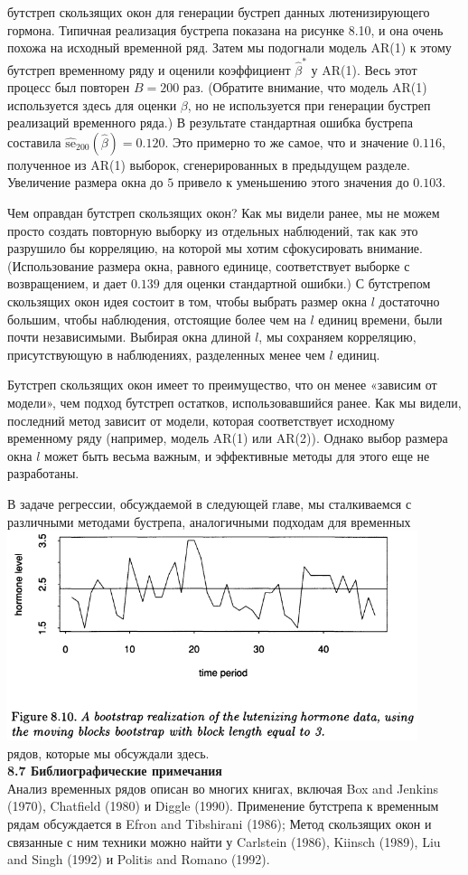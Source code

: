 \documentclass{report}
\begin{document}
бутстреп скользящих окон для генерации бустреп данных лютенизирующего гормона. Типичная реализация бустрепа показана на рисунке 8.10, и она очень похожа на исходный временной ряд. Затем мы подогнали модель AR(1) к этому бутстреп временному ряду и оценили коэффициент $\hat \beta^*$ у AR(1). Весь этот процесс был повторен $B=200$ раз. (Обратите внимание, что модель AR(1) используется здесь для оценки $\beta$, но не используется при генерации бустреп реализаций временного ряда.) В результате стандартная ошибка бустрепа составила $\widehat {\text{se}}_{200} (\hat \beta) = 0.120$. Это примерно то же самое, что и значение $0.116$, полученное из AR(1) выборок, сгенерированных в предыдущем разделе. Увеличение размера окна до $5$ привело к уменьшению этого значения до $0.103$.

Чем оправдан бутстреп скользящих окон? Как мы видели ранее, мы не можем просто создать повторную выборку из отдельных наблюдений, так как это разрушило бы корреляцию, на которой мы хотим сфокусировать внимание. (Использование размера окна, равного единице, соответствует выборке с возвращением, и дает $0.139$ для оценки стандартной ошибки.) С бутстрепом скользящих окон идея состоит в том, чтобы выбрать размер окна $l$ достаточно большим, чтобы наблюдения, отстоящие более чем на $l$ единиц времени, были почти независимыми. Выбирая окна длиной $l$, мы сохраняем корреляцию, присутствующую в наблюдениях, разделенных менее чем $l$ единиц.

Бутстреп скользящих окон имеет то преимущество, что он менее «зависим от модели», чем подход бутстреп остатков, использовавшийся ранее. Как мы видели, последний метод зависит от модели, которая соответствует исходному временному ряду (например, модель AR(1) или AR(2)). Однако выбор размера окна $l$ может быть весьма важным, и эффективные методы для этого еще не разработаны.

В задаче регрессии, обсуждаемой в следующей главе, мы сталкиваемся с различными методами бустрепа, аналогичными подходам для временных\\
\includegraphics[width=12cm]{fig810}\\
рядов, которые мы обсуждали здесь.\\
\textbf{8.7 Библиографические примечания}\\
Анализ временных рядов описан во многих книгах, включая Box and Jenkins (1970), Chatfield (1980) и Diggle (1990). Применение бутстрепа к временным рядам обсуждается в Efron and Tibshirani (1986); Метод скользящих окон и связанные с ним техники можно найти у Carlstein (1986), Kiinsch (1989), Liu and Singh (1992) и Politis and Romano (1992).
\end{document}

